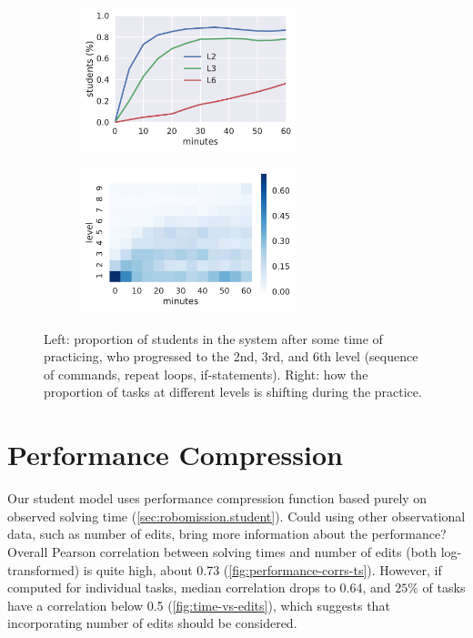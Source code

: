 \begin{figure}[htb]
\centering
\begin{subfigure}{.49\textwidth}
\centering
\includegraphics[height=42mm]{img/students-at-levels}
\end{subfigure}
\begin{subfigure}{.49\textwidth}
\centering
\includegraphics[height=42mm]{img/task-sessions-at-levels}
\end{subfigure}
\caption{%
  Left: proportion of students in the system after some time of practicing,
  who progressed to the 2nd, 3rd, and 6th level (sequence of commands, repeat loops, if-statements).
  Right: how the proportion of tasks at different levels is shifting during the practice.}
\label{fig:students-at-levels}
\end{figure}

\section{Performance Compression}

Our student model uses %
performance compression function based purely on observed solving time
(\cref{sec:robomission.student}).
Could using other observational data, such as number of edits,
bring more information about the performance?
Overall Pearson correlation between solving times and number of edits (both
log-transformed) is quite high, about 0.73 (\cref{fig:performance-corrs-ts}).
However, if computed for individual tasks,
median correlation drops to 0.64, %
and $25\%$ of tasks have a correlation below 0.5 %
(\cref{fig:time-vs-edits}), which suggests that incorporating number of edits should be considered.

